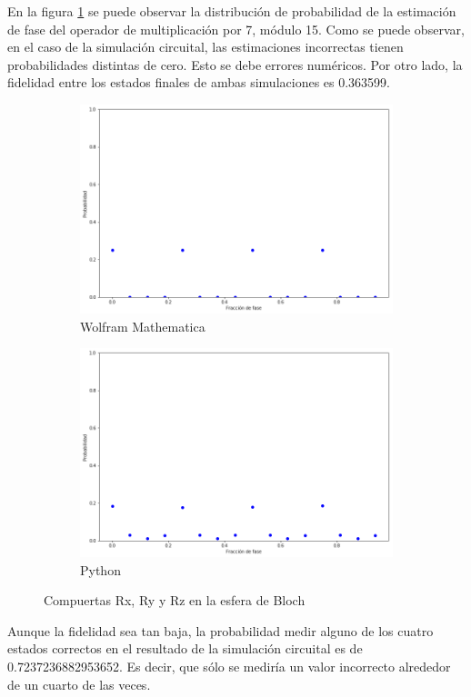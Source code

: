 En la figura \ref{fig:shor15} se puede observar la distribución de probabilidad de la estimación de fase del operador de multiplicación por 7, módulo 15. Como se puede observar, en el caso de la simulación circuital, las estimaciones incorrectas tienen probabilidades distintas de cero. Esto se debe errores numéricos. Por otro lado, la fidelidad entre los estados finales de ambas simulaciones es 0.363599.

\begin{figure}[H]
    \centering
    \begin{subfigure}[m]{0.45\textwidth}
        \centering
        \includegraphics[width=0.9\linewidth]{img/ShorM15.png}
        \caption{Wolfram Mathematica}
    \end{subfigure}
    \begin{subfigure}[m]{0.45\textwidth}
        \centering
        \includegraphics[width=0.9\linewidth]{img/shorlossless.png}
        \caption{Python}
    \end{subfigure}
    \caption[]{Compuertas Rx, Ry y Rz en la esfera de Bloch}
    \label{fig:shor15}
\end{figure}

Aunque la fidelidad sea tan baja, la probabilidad medir alguno de los cuatro estados correctos en el resultado de la simulación circuital es de 0.7237236882953652. Es decir, que sólo se mediría un valor incorrecto alrededor de un cuarto de las veces.

